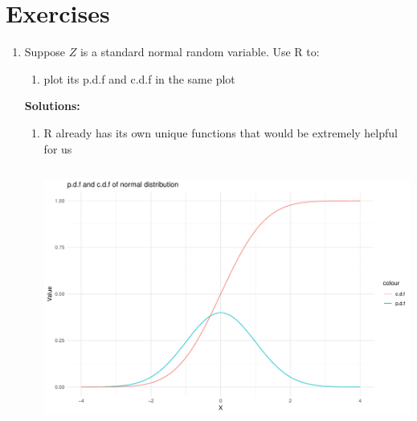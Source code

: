 \section{Exercises}
\begin{enumerate}
    \item Suppose $Z$ is a standard normal random variable. Use R to:
        \begin{enumerate}
            \item plot its p.d.f and c.d.f in the same plot
        \end{enumerate}
        \textbf{Solutions:}\\
        \begin{enumerate}
            \item R already has its own unique functions that would be extremely helpful for us \\
                \inputminted{R}{src/chapter2/standardnormalplot.R}
                \begin{center}
                    \includegraphics[width=1\textwidth]{src/chapter2/plot.pdf}
                \end{center}
        \end{enumerate}
\end{enumerate}
